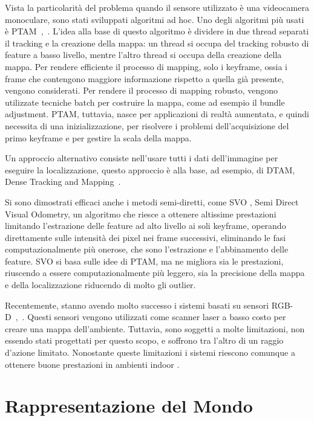 Vista la particolarità del problema quando il sensore utilizzato è una videocamera monoculare, sono stati sviluppati algoritmi ad hoc.
Uno degli algoritmi più usati è PTAM~\cite{klein07parallel},~\cite{klein08improving}.
L'idea alla base di questo algoritmo è dividere in due thread separati il tracking e la creazione della mappa: un thread si occupa del tracking robusto di feature a basso livello, mentre l'altro thread si occupa della creazione della mappa. 
Per rendere efficiente il processo di mapping, solo i keyframe, ossia i frame che contengono maggiore informazione rispetto a quella già presente, vengono considerati.
Per rendere il processo di mapping robusto, vengono utilizzate tecniche batch per costruire la mappa, come ad esempio il bundle adjustment. %
PTAM, tuttavia, nasce per applicazioni di realtà aumentata, e quindi necessita di una inizializzazione, per risolvere i problemi dell'acquisizione del primo keyframe e per gestire la scala della mappa.

Un approccio alternativo consiste nell'usare tutti i dati dell'immagine per eseguire la localizzazione, questo approccio è alla base, ad esempio, di DTAM, Dense Tracking and Mapping~\cite{conf/iccv/NewcombeLD11}.%

Si sono dimostrati efficaci anche i metodi semi-diretti, come SVO %
, Semi Direct Visual Odometry, un algoritmo che riesce a ottenere altissime prestazioni limitando l'estrazione delle feature ad alto livello ai soli keyframe, operando direttamente sulle intensità dei pixel nei frame successivi, eliminando le fasi computazionalmente più onerose, che sono l'estrazione e l'abbinamento delle feature. SVO si basa sulle idee di PTAM, ma ne migliora sia le prestazioni, riuscendo a essere computazionalmente più leggero, sia la precisione della mappa e della localizzazione riducendo di molto gli outlier.

Recentemente, stanno avendo molto successo i sistemi basati su sensori RGB-D~\cite{izadi2011kinectfusion},~\cite{henry2012rgb}. Questi sensori vengono utilizzati come scanner laser a basso costo per creare una mappa dell'ambiente. Tuttavia, sono soggetti a molte limitazioni, non essendo stati progettati per questo scopo, e soffrono tra l'altro di un raggio d'azione limitato. Nonostante queste limitazioni i sistemi riescono comunque a ottenere buone prestazioni in ambienti indoor \cite{sturm2012benchmark}.

\section{Rappresentazione del Mondo}

